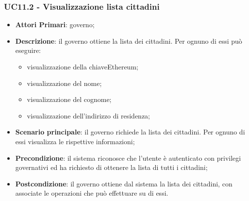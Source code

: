 \subsubsection{UC11.2 - Visualizzazione lista cittadini}
\begin{itemize}
	\item \textbf{Attori Primari}: governo;
	\item \textbf{Descrizione}: il governo ottiene la lista dei cittadini. Per ognuno di essi può eseguire:
	\begin{itemize}
		\item visualizzazione della chiave\glosp Ethereum;
		\item visualizzazione del nome;
		\item visualizzazione del cognome;
		\item visualizzazione dell'indirizzo di residenza;
	\end{itemize}
	\item \textbf{Scenario principale}: il governo richiede la lista dei cittadini. Per ognuno di essi visualizza le rispettive informazioni;
	\item \textbf{Precondizione}: il sistema riconosce che l'utente è autenticato con privilegi governativi ed ha richiesto di ottenere la lista di tutti i cittadini;
	\item \textbf{Postcondizione}: il governo ottiene dal sistema la lista dei cittadini, con associate le operazioni che può effettuare su di essi.
\end{itemize}
